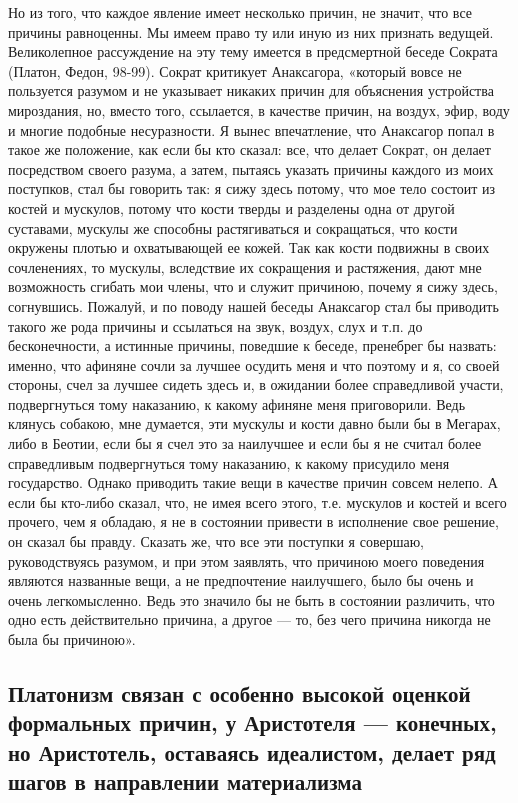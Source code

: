 Но из того, что каждое явление имеет несколько причин, не значит, что
все причины равноценны. Мы имеем право ту или иную из них признать
ведущей. Великолепное рассуждение на эту тему имеется в предсмертной
беседе Сократа (Платон, Федон, 98-99). Сократ критикует Анаксагора,
«который вовсе не пользуется разумом и не указывает никаких причин для
объяснения устройства мироздания, но, вместо того, ссылается, в
качестве причин, на воздух, эфир, воду и многие подобные несуразности.
Я вынес впечатление, что Анаксагор попал в такое же положение, как
если бы кто сказал: все, что делает Сократ, он делает посредством
своего разума, а затем, пытаясь указать причины каждого из моих
поступков, стал бы говорить так: я сижу здесь потому, что мое тело
состоит из костей и мускулов, потому что кости тверды и разделены одна
от другой суставами, мускулы же способны растягиваться и сокращаться,
что кости окружены плотью и охватывающей ее кожей. Так как кости
подвижны в своих сочленениях, то мускулы, вследствие их сокращения и
растяжения, дают мне возможность сгибать мои члены, что и служит
причиною, почему я сижу здесь, согнувшись. Пожалуй, и по поводу нашей
беседы Анаксагор стал бы приводить такого же рода причины и ссылаться
на звук, воздух, слух и т.п. до бесконечности, а истинные причины,
поведшие к беседе, пренебрег бы назвать: именно, что афиняне сочли за
лучшее осудить меня и что поэтому и я, со своей стороны, счел за
лучшее сидеть здесь и, в ожидании более справедливой участи,
подвергнуться тому наказанию, к какому афиняне меня приговорили. Ведь
клянусь собакою, мне думается, эти мускулы и кости давно были бы в
Мегарах, либо в Беотии, если бы я счел это за наилучшее и если бы я не
считал более справедливым подвергнуться тому наказанию, к какому
присудило меня государство. Однако приводить такие вещи в качестве
причин совсем нелепо. А если бы кто-либо сказал, что, не имея всего
этого, т.е. мускулов и костей и всего прочего, чем я обладаю, я не в
состоянии привести в исполнение свое решение, он сказал бы правду.
Сказать же, что все эти поступки я совершаю, руководствуясь разумом, и
при этом заявлять, что причиною моего поведения являются названные
вещи, а не предпочтение наилучшего, было бы очень и очень
легкомысленно. Ведь это значило бы не быть в состоянии различить, что
одно есть действительно причина, а другое --- то, без чего причина
никогда не была бы причиною».

\subsection{Платонизм связан с особенно высокой оценкой формальных
причин, у Аристотеля --- конечных, но Аристотель, оставаясь
идеалистом, делает ряд шагов в направлении материализма}

